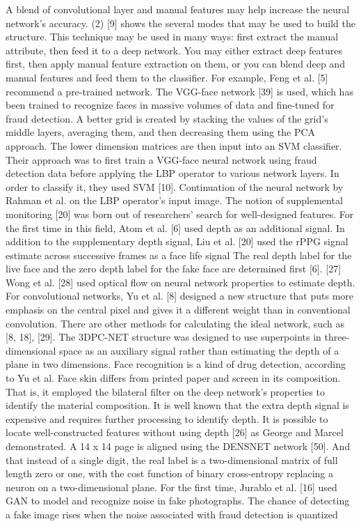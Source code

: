 \documentclass[journal]{IEEEtran}
\begin{document}
A blend of convolutional layer and manual features may help increase the neural network's accuracy. (2) [9] shows the several modes that may be used to build the structure. This technique may be used in many ways: first extract the manual attribute, then feed it to a deep network. You may either extract deep features first, then apply manual feature extraction on them, or you can blend deep and manual features and feed them to the classifier.
For example, Feng et al. [5] recommend a pre-trained network. The VGG-face network [39] is used, which has been trained to recognize faces in massive volumes of data and fine-tuned for fraud detection. A better grid is created by stacking the values of the grid's middle layers, averaging them, and then decreasing them using the PCA approach. The lower dimension matrices are then input into an SVM classifier.
Their approach was to first train a VGG-face neural network using fraud detection data before applying the LBP operator to various network layers. In order to classify it, they used SVM [10].
Continuation of the neural network by Rahman et al. on the LBP operator's input image. The notion of supplemental monitoring [20] was born out of researchers' search for well-designed features.
For the first time in this field, Atom et al. [6] used depth as an additional signal.
In addition to the supplementary depth signal, Liu et al. [20] used the rPPG signal estimate across successive frames as a face life signal The real depth label for the live face and the zero depth label for the fake face are determined first [6].
[27] Wong et al. [28] used optical flow on neural network properties to estimate depth.
For convolutional networks, Yu et al. [8] designed a new structure that puts more emphasis on the central pixel and gives it a different weight than in conventional convolution. There are other methods for calculating the ideal network, such as [8, 18], [29].
The 3DPC-NET structure was designed to use superpoints in three-dimensional space as an auxiliary signal rather than estimating the depth of a plane in two dimensions.
Face recognition is a kind of drug detection, according to Yu et al. Face skin differs from printed paper and screen in its composition. That is, it employed the bilateral filter on the deep network's properties to identify the material composition.
It is well known that the extra depth signal is expensive and requires further processing to identify depth.
It is possible to locate well-constructed features without using depth [26] as George and Marcel demonstrated. A 14 x 14 page is aligned using the DENSNET network [50]. And that instead of a single digit, the real label is a two-dimensional matrix of full length zero or one, with the cost function of binary cross-entropy replacing a neuron on a two-dimensional plane.
For the first time, Jurablo et al. [16] used GAN to model and recognize noise in fake photographs. The chance of detecting a fake image rises when the noise associated with fraud detection is quantized
\end{document}
